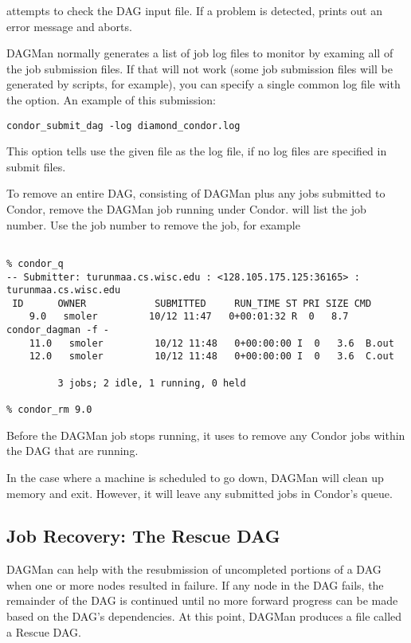  attempts to check the DAG input file.
If a problem is detected,
 prints out an error message and aborts.

DAGMan normally generates a list of job log files to
monitor by examing all of the job submission files.  If
that will not work (some job submission files will be generated
by  scripts, for example), you can specify a single
common log file with the  option.
An example of this submission:
\begin{verbatim}
condor_submit_dag -log diamond_condor.log
\end{verbatim}
This option tells  use the given file as
the log file, if no log files are specified in submit files.

To remove an entire DAG, consisting of DAGMan plus
any jobs submitted to Condor,
remove the DAGMan job running under Condor.
 will list the job number.
Use the job number to remove the job, for example

\footnotesize
\begin{verbatim}

% condor_q
-- Submitter: turunmaa.cs.wisc.edu : <128.105.175.125:36165> : turunmaa.cs.wisc.edu
 ID      OWNER            SUBMITTED     RUN_TIME ST PRI SIZE CMD
    9.0   smoler         10/12 11:47   0+00:01:32 R  0   8.7  condor_dagman -f -
    11.0   smoler         10/12 11:48   0+00:00:00 I  0   3.6  B.out
    12.0   smoler         10/12 11:48   0+00:00:00 I  0   3.6  C.out

         3 jobs; 2 idle, 1 running, 0 held

% condor_rm 9.0
\end{verbatim}
\normalsize

Before the DAGMan job stops running, it uses 
to remove any Condor jobs within the DAG that are running.

In the case where a
machine is scheduled to go down,
DAGMan will clean up memory and exit.
However, it will leave any submitted jobs
in Condor's queue.

\subsection{Job Recovery:  The Rescue DAG}

DAGMan can help with the resubmission of uncompleted
portions of a DAG when one or more nodes resulted in failure.
If any node in the DAG fails,
the remainder of the DAG is continued until no more forward
progress can be made based on the DAG's dependencies.
At this point, DAGMan produces a file
called a Rescue DAG.

